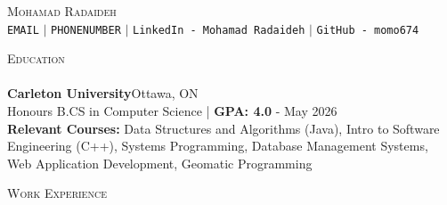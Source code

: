 \documentclass[a4paper]{article}
\newcommand{\lineunder} {
    \vspace*{-8pt} \\
    \hspace*{-18pt} \hrulefill \\
}
\newcommand{\header} [1] {
    {\hspace*{-18pt}\vspace*{6pt} \textsc{#1}}
    \vspace*{-6pt} \lineunder
}
\newcommand{\courses} [1] {
    \textbf{Relevant Courses:} #1 \\
}
\begin{document}
\vspace*{-40pt}

\vspace*{-10pt}
\begin{center}
    {\Huge \scshape {Mohamad Radaideh}}\\
    \texttt{EMAIL} $\vert$ \texttt{PHONENUMBER} $\vert$ \texttt{LinkedIn - Mohamad Radaideh} $\vert$ \texttt{GitHub - momo674}
\end{center}

\header{Education}
\textbf{Carleton University}\hfill Ottawa, ON\\
Honours B.CS in Computer Science | \textbf{GPA: 4.0} \hfill  - May 2026\\
\courses{Data Structures and Algorithms (Java), Intro to Software Engineering (C++), Systems Programming, Database Management Systems, Web Application Development, Geomatic Programming }
\vspace{2mm}

\header{Work Experience}
\vspace{1mm}
\end{document}
